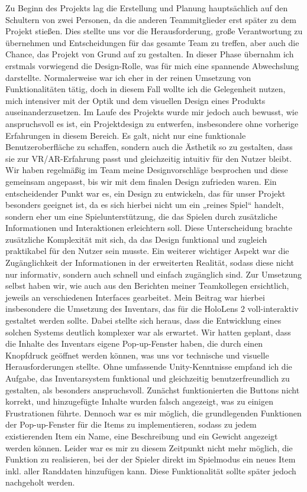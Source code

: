 \documentclass[11pt]{article}
\begin{document}
    Zu Beginn des Projekts lag die Erstellung und Planung hauptsächlich auf den Schultern von zwei Personen, da die anderen Teammitglieder erst später zu dem Projekt stießen. Dies stellte uns vor die Herausforderung, große Verantwortung zu übernehmen und Entscheidungen für das gesamte Team zu treffen, aber auch die Chance, das Projekt von Grund auf zu gestalten. In dieser Phase übernahm ich erstmals vorwiegend die Design-Rolle, was für mich eine spannende Abwechslung darstellte. Normalerweise war ich eher in der reinen Umsetzung von Funktionalitäten tätig, doch in diesem Fall wollte ich die Gelegenheit nutzen, mich intensiver mit der Optik und dem visuellen Design eines Produkts auseinanderzusetzen.
    Im Laufe des Projekts wurde mir jedoch auch bewusst, wie anspruchsvoll es ist, ein Projektdesign zu entwerfen, insbesondere ohne vorherige Erfahrungen in diesem Bereich. Es galt, nicht nur eine funktionale Benutzeroberfläche zu schaffen, sondern auch die Ästhetik so zu gestalten, dass sie zur VR/AR-Erfahrung passt und gleichzeitig intuitiv für den Nutzer bleibt. Wir haben regelmäßig im Team meine Designvorschläge besprochen und diese gemeinsam angepasst, bis wir mit dem finalen Design zufrieden waren.
    Ein entscheidender Punkt war es, ein Design zu entwickeln, das für unser Projekt besonders geeignet ist, da es sich hierbei nicht um ein „reines Spiel“ handelt, sondern eher um eine Spielunterstützung, die das Spielen durch zusätzliche Informationen und Interaktionen erleichtern soll. Diese Unterscheidung brachte zusätzliche Komplexität mit sich, da das Design funktional und zugleich praktikabel für den Nutzer sein musste. Ein weiterer wichtiger Aspekt war die Zugänglichkeit der Informationen in der erweiterten Realität, sodass diese nicht nur informativ, sondern auch schnell und einfach zugänglich sind.
    Zur Umsetzung selbst haben wir, wie auch aus den Berichten meiner Teamkollegen ersichtlich, jeweils an verschiedenen Interfaces gearbeitet. Mein Beitrag war hierbei insbesondere die Umsetzung des Inventars, das für die HoloLens 2 voll-interaktiv gestaltet werden sollte. Dabei stellte sich heraus, dass die Entwicklung eines solchen Systems deutlich komplexer war als erwartet. Wir hatten geplant, dass die Inhalte des Inventars eigene Pop-up-Fenster haben, die durch einen Knopfdruck geöffnet werden können, was uns vor technische und visuelle Herausforderungen stellte. Ohne umfassende Unity-Kenntnisse empfand ich die Aufgabe, das Inventarsystem funktional und gleichzeitig benutzerfreundlich zu gestalten, als besonders anspruchsvoll.
    Zunächst funktionierten die Buttons nicht korrekt, und hinzugefügte Inhalte wurden falsch angezeigt, was zu einigen Frustrationen führte. Dennoch war es mir möglich, die grundlegenden Funktionen der Pop-up-Fenster für die Items zu implementieren, sodass zu jedem existierenden Item ein Name, eine Beschreibung und ein Gewicht angezeigt werden können. Leider war es mir zu diesem Zeitpunkt nicht mehr möglich, die Funktion zu realisieren, bei der der Spieler direkt im Spielmodus ein neues Item inkl. aller Randdaten hinzufügen kann. Diese Funktionalität sollte später jedoch nachgeholt werden.
\end{document}
